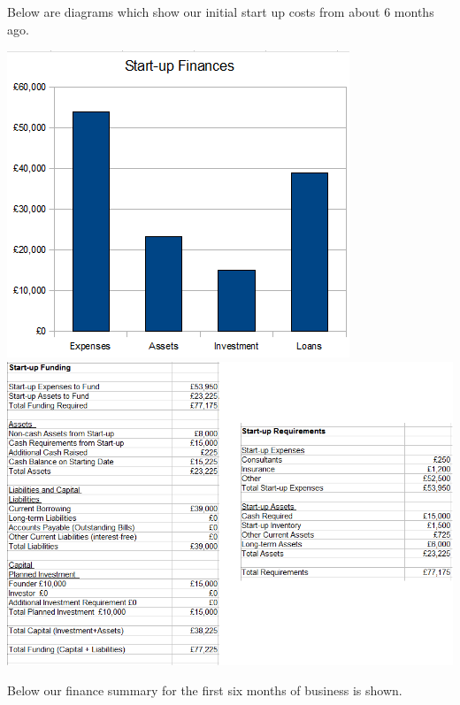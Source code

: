 \documentclass{article}
\begin{document}
Below are diagrams which show our initial start up costs from about 6 months ago.

\includegraphics[scale=1.0]{startupFinance.png} \\
\includegraphics[scale=1.0]{startupFinanceData.png}

Below our finance summary for the first six months of business is shown.
\end{document}
